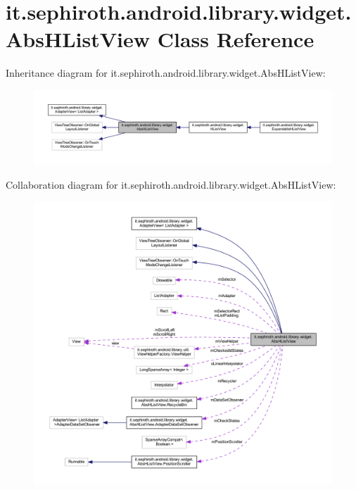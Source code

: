 \hypertarget{classit_1_1sephiroth_1_1android_1_1library_1_1widget_1_1_abs_h_list_view}{}\section{it.\+sephiroth.\+android.\+library.\+widget.\+Abs\+H\+List\+View Class Reference}
\label{classit_1_1sephiroth_1_1android_1_1library_1_1widget_1_1_abs_h_list_view}


Inheritance diagram for it.\+sephiroth.\+android.\+library.\+widget.\+Abs\+H\+List\+View\+:
\nopagebreak
\begin{figure}[H]
\begin{center}
\leavevmode
\includegraphics[width=350pt]{classit_1_1sephiroth_1_1android_1_1library_1_1widget_1_1_abs_h_list_view__inherit__graph}
\end{center}
\end{figure}


Collaboration diagram for it.\+sephiroth.\+android.\+library.\+widget.\+Abs\+H\+List\+View\+:
\nopagebreak
\begin{figure}[H]
\begin{center}
\leavevmode
\includegraphics[width=350pt]{classit_1_1sephiroth_1_1android_1_1library_1_1widget_1_1_abs_h_list_view__coll__graph}
\end{center}
\end{figure}
